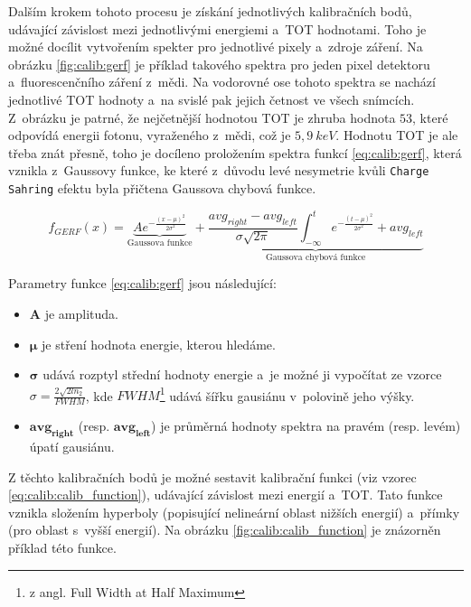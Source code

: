 Dalším krokem tohoto procesu je získání jednotlivých kalibračních bodů, udávající závislost mezi jednotlivými energiemi a~TOT hodnotami. Toho je možné docílit vytvořením spekter pro jednotlivé pixely a~zdroje záření. Na obrázku \ref{fig:calib:gerf} je příklad takového spektra pro jeden pixel detektoru a~fluorescenčního záření z~mědi. Na vodorovné ose tohoto spektra se nachází jednotlivé TOT hodnoty a~na svislé pak jejich četnost ve všech snímcích. Z~obrázku je patrné, že nejčetnější hodnotou TOT je zhruba hodnota $53$, které odpovídá energii fotonu, vyraženého z~mědi, což je $5,9~keV$. Hodnotu TOT je ale třeba znát přesně, toho je docíleno proložením spektra funkcí \ref{eq:calib:gerf}, která vznikla z~Gaussovy funkce, ke které z~důvodu levé nesymetrie kvůli \texttt{Charge Sahring} efektu byla přičtena Gaussova chybová funkce. 

\begin{equation}\label{eq:calib:gerf}
	f_{GERF}(x) = \underbrace{Ae^{ -\frac{(x-\mu)^2}{2\sigma^2} }}_{\text{Gaussova funkce}} +
	\underbrace{ \frac{avg_{right} - avg_{left}}{\sigma\sqrt{2\pi}} \int_{-\infty}^t e^{ -\frac{(t-\mu)^2}{2\sigma^2} } + avg_{left}}_{\text{Gaussova chybová funkce}}
\end{equation}

Parametry funkce \ref{eq:calib:gerf} jsou následující:
\begin{itemize}
	\item $\mathbf{A}$ je amplituda.
	\item $\mathbf{\mu}$ je stření hodnota energie, kterou hledáme.
	\item $\mathbf{\sigma}$ udává rozptyl střední hodnoty energie a~je možné ji vypočítat ze vzorce 
		$\sigma = \frac{2\sqrt{2ln_2}}{FWHM}$, kde $FWHM$\footnote{z angl. Full Width at Half Maximum} udává šířku gausiánu v~polovině jeho výšky.
	\item $\mathbf{avg_{right}}$ (resp. $\mathbf{avg_{left}}$) je průměrná hodnoty spektra na pravém (resp. levém) úpatí gausiánu.
\end{itemize}

Z těchto kalibračních bodů je možné sestavit kalibrační funkci (viz vzorec \ref{eq:calib:calib_function}), udávající závislost mezi energií a~TOT. Tato funkce vznikla složením hyperboly (popisující nelineární oblast nižších energií) a~přímky (pro oblast s~vyšší energií). Na obrázku \ref{fig:calib:calib_function} je znázorněn příklad této funkce.


